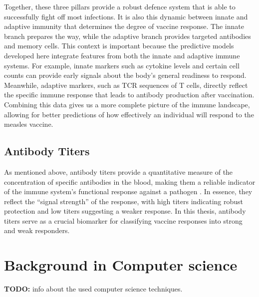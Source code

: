\documentclass[12pt,a4paper]{report}
\newcommand{\todo}[1]{%
  \par\noindent%
  \begin{tcolorbox}[colback=yellow, colframe=black, boxrule=0.5pt, sharp corners, width=\linewidth, before skip=5pt, after skip=5pt]
    \textbf{TODO:} #1
  \end{tcolorbox}%
  \par
}
\begin{document}
\noindent
Together, these three pillars provide a robust defence system that is able to successfully fight off most infections. It is also this dynamic between innate and adaptive immunity that determines the degree of vaccine response. The innate branch prepares the way, while the adaptive branch provides targeted antibodies and memory cells. This context is important because the predictive models developed here integrate features from both the innate and adaptive immune systems. For example, innate markers such as cytokine levels and certain cell counts can provide early signals about the body's general readiness to respond. Meanwhile, adaptive markers, such as TCR sequences of T cells, directly reflect the specific immune response that leads to antibody production after vaccination. Combining this data gives us a more complete picture of the immune landscape, allowing for better predictions of how effectively an individual will respond to the measles vaccine.

\subsection{Antibody Titers}
\label{sec:antibody_titers}
As mentioned above, antibody titers provide a quantitative measure of the concentration of specific antibodies in the blood, making them a reliable indicator of the immune system’s functional response against a pathogen \cite{plotkin2010correlates}. In essence, they reflect the “signal strength” of the response, with high titers indicating robust protection and low titers suggesting a weaker response. In this thesis, antibody titers serve as a crucial biomarker for classifying vaccine responses into strong and weak responders. 

\pagebreak
\section{Background in Computer science}
\todo{info about the used computer science techniques.}
\pagebreak
\end{document}
